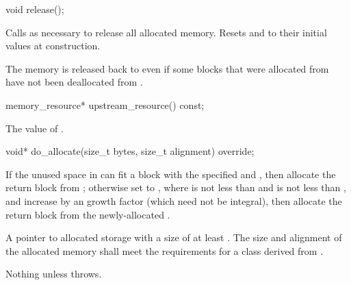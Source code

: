 %
\begin{itemdecl}
void release();
\end{itemdecl}

\begin{itemdescr}
\pnum
\effects
Calls  as necessary
to release all allocated memory.
Resets  and 
to their initial values at construction.

\pnum
\begin{note}
The memory is released back to 
even if some blocks that were allocated from 
have not been deallocated from .
\end{note}
\end{itemdescr}

%
\begin{itemdecl}
memory_resource* upstream_resource() const;
\end{itemdecl}

\begin{itemdescr}
\pnum
\returns
The value of .
\end{itemdescr}

%
\begin{itemdecl}
void* do_allocate(size_t bytes, size_t alignment) override;
\end{itemdecl}

\begin{itemdescr}
\pnum
\effects
If the unused space in 
can fit a block with the specified  and ,
then allocate the return block from ;
otherwise set  to ,
where  is not less than  and
 is not less than ,
and increase 
by an  growth factor (which need not be integral),
then allocate the return block from the newly-allocated .

\pnum
\returns
A pointer to allocated storage
with a size of at least .
The size and alignment of the allocated memory shall meet the requirements
for a class derived from .

\pnum
\throws
Nothing unless  throws.
\end{itemdescr}


